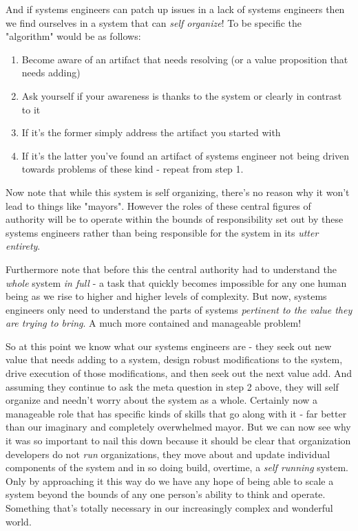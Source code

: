 \documentclass[11pt,a5paper]{book}
\begin{document}
And if systems engineers can patch up issues in a lack of systems engineers then we find ourselves in a system that can \textit{self organize}! To be specific the "algorithm" would be as follows:

\begin{enumerate}
\item Become aware of an artifact that needs resolving (or a value proposition that needs adding)
\item Ask yourself if your awareness is thanks to the system or clearly in contrast to it
\item If it's the former simply address the artifact you started with
\item If it's the latter you've found an artifact of systems engineer not being driven towards problems of these kind - repeat from step 1.
\end{enumerate}

Now note that while this system is self organizing, there's no reason why it won't lead to things like "mayors". However the roles of these central figures of authority will be to operate within the bounds of responsibility set out by these systems engineers rather than being responsible for the system in its \textit{utter entirety}.
\newline

Furthermore note that before this the central authority had to understand the \textit{whole} system \textit{in full} - a task that quickly becomes impossible for any one human being as we rise to higher and higher levels of complexity. But now, systems engineers only need to understand the parts of systems \textit{pertinent to the value they are trying to bring}. A much more contained and manageable problem!
\newline 

So at this point we know what our systems engineers are - they seek out new value that needs adding to a system, design robust modifications to the system, drive execution of those modifications, and then seek out the next value add. And assuming they continue to ask the meta question in step 2 above, they will self organize and needn't worry about the system as a whole. Certainly now a manageable role that has specific kinds of skills that go along with it - far better than our imaginary and completely overwhelmed mayor. But we can now see why it was so important to nail this down because it should be clear that organization developers do not \textit{run} organizations, they move about and update individual components of the system and in so doing build, overtime, a \textit{self running} system. Only by approaching it this way do we have any hope of being able to scale a system beyond the bounds of any one person's ability to think and operate. Something that's totally necessary in our increasingly complex and wonderful world. 



\end{document}
